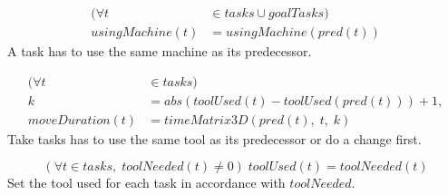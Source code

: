 \documentclass[10pt,a4paper]{report}
\begin{document}
\begin{equation}\label{eq:115}
\begin{aligned}
(\forall t &\in tasks \cup goalTasks) \\
usingMachine(t) &= usingMachine(pred(t)) 
\end{aligned}
\end{equation}
A task has to use the same machine as its predecessor.

\begin{equation}\label{eq:116}
\begin{aligned}
(\forall t &\in tasks) \\
k &= abs(toolUsed(t) - toolUsed(pred(t))) + 1, \\
moveDuration(t) &= timeMatrix3D(pred(t), \; t, \; k)
\end{aligned}
\end{equation}
Take tasks has to use the same tool as its predecessor or do a change first.

\begin{equation}\label{eq:117}
(\forall t \in tasks, \; toolNeeded(t) \neq 0) \; toolUsed(t) = toolNeeded(t)
\end{equation}
Set the tool used for each task in accordance with $toolNeeded$.
\end{document}
